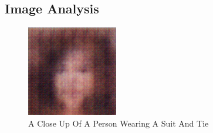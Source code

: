 \documentclass{article}%
\begin{document}
%
\subsection{Image Analysis}%
\label{subsec:ImageAnalysis}%


\begin{figure}[h!]%
\centering%
\includegraphics[width=150px]{500_fake_images/samples_5_372.png}%
\caption{A Close Up Of A Person Wearing A Suit And Tie}%
\end{figure}

%
\end{document}
